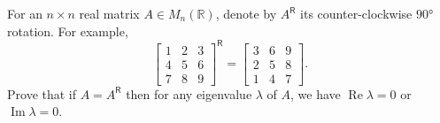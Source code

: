For an \(n \times n\) real matrix \(A \in M_n(\mathbb{R})\), denote by \(A^{\mathsf{R}}\) its counter-clockwise \(90°\) rotation. For example,
\[
\begin{bmatrix} 1 & 2 & 3 \\ 4 & 5 & 6 \\ 7 & 8 & 9 \end{bmatrix}^{\mathsf{R}} = \begin{bmatrix} 3 & 6 & 9 \\ 2 & 5 & 8 \\ 1 & 4 & 7 \end{bmatrix}.
\]
Prove that if \(A = A^{\mathsf{R}}\) then for any eigenvalue \(\lambda\) of \(A\), we have \(\operatorname{Re} \lambda = 0\) or \(\operatorname{Im} \lambda = 0\).
